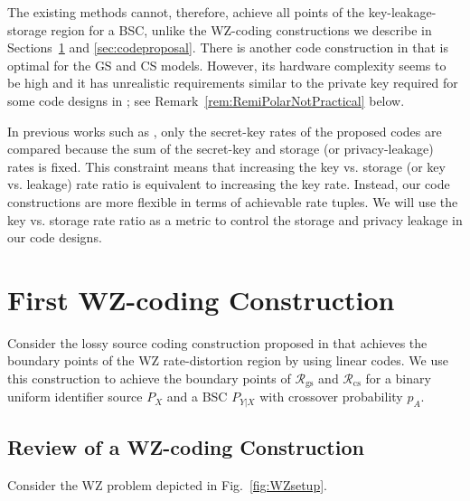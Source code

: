 \documentclass[journal,10pt,twoside]{IEEEtran}
\begin{document}
The existing methods cannot, therefore, achieve all points of the key-leakage-storage region for a BSC, unlike the WZ-coding constructions we describe in Sections~\ref{sec:firstWZconstruction} and \ref{sec:codeproposal}. {There is another code construction in \cite{RemiPolarConstruction} that is optimal for the GS and CS models. However, its hardware complexity seems to be high and it has unrealistic requirements similar to the private key required for some code designs in \cite{IgnaPolar}; see Remark~\ref{rem:RemiPolarNotPractical} below.} 

In previous works such as \cite{Pufky}, only the secret-key rates of the proposed codes are compared because the sum of the secret-key and storage (or privacy-leakage) rates is fixed. This constraint means that increasing the key vs. storage (or key vs. leakage) rate ratio is equivalent to increasing the key rate. Instead, our code constructions are more flexible in terms of achievable rate tuples. We will use the key vs. storage rate ratio as a metric to control the storage and privacy leakage in our code designs.

\section{First WZ-coding Construction}\label{sec:firstWZconstruction}
Consider the lossy source coding construction proposed in \cite[Section IV]{lossysourcecoding} that achieves the boundary points of the WZ rate-distortion region by using linear codes. We use this construction to achieve the boundary points of $\mathcal{R}_{\text{gs}}$ and $\mathcal{R}_{\text{cs}}$ for a binary uniform identifier source $P_X$ and a BSC $P_{Y|X}$ with crossover probability $p_A$. 

\subsection{Review of a WZ-coding Construction}
Consider the WZ problem depicted in Fig.~\ref{fig:WZsetup}.
\end{document}
